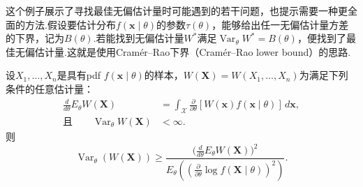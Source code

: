 这个例子展示了寻找最佳无偏估计量时可能遇到的若干问题，也提示需要一种更全面的方法.假设要估计分布$f(\boldsymbol x\mid\theta)$的参数$\tau(\theta)$，能够给出任一无偏估计量方差的下界，记为$B(\theta)$.若能找到无偏估计量$W^*$满足$\operatorname{Var}_\theta W^*=B(\theta)$，便找到了最佳无偏估计量.这就是使用Cramér--Rao下界（Cramér--Rao lower bound）的思路.
\begin{theorem}\label{thm:7.3.9}
设$X_1,\ldots,X_n$是具有pdf $f(\boldsymbol x\mid\theta)$的样本，$W(\boldsymbol X)=W(X_1,\ldots,X_n)$为满足下列条件的任意估计量：
\begin{equation}\label{eq:7.3.4}
\begin{aligned}
\frac d{d\theta}E_\theta W(\boldsymbol X)&=\int_{\mathcal X}\frac\partial{\partial\theta}[W(\boldsymbol x)f(\boldsymbol x\mid\theta)]\,d\boldsymbol x,\\
\text{且}\qquad\operatorname{Var}_\theta W(\boldsymbol X)&<\infty.
\end{aligned}
\end{equation}
则
\begin{equation}\label{eq:7.3.5}
\operatorname{Var}_\theta(W(\boldsymbol X))\ge\frac{\bigl(\frac d{d\theta}E_\theta W(\boldsymbol X)\bigr)^2}{E_\theta\left(\left(\frac\partial{\partial\theta}\log f(\boldsymbol X\mid\theta)\right)^2\right)}.
\end{equation}
\end{theorem}
